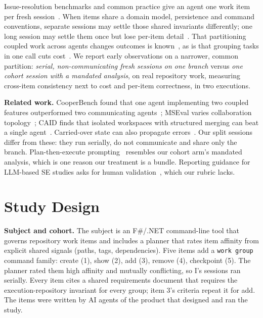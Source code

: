 \documentclass[10pt,conference]{IEEEtran}
\newcommand{\I}{I}
\begin{document}
Issue-resolution benchmarks and common practice give an agent one work item per fresh session~\cite{jimenez2024swebench}. When items share a domain model, persistence and command conventions, separate sessions may settle those shared invariants differently; one long session may settle them once but lose per-item detail~\cite{liu2024lost}. That partitioning coupled work across agents changes outcomes is known~\cite{khatua2026cooperbench,ren2026coordination}, as is that grouping tasks in one call cuts cost~\cite{cheng2023batch}. We report early observations on a narrower, common partition: \emph{serial, non-communicating fresh sessions on one branch} versus \emph{one cohort session with a mandated analysis}, on real repository work, measuring cross-item consistency next to cost and per-item correctness, in two executions.

\textbf{Related work.} CooperBench found that one agent implementing two coupled features outperformed two communicating agents~\cite{khatua2026cooperbench}; MSEval varies collaboration topology~\cite{ren2026coordination}; CAID finds that isolated workspaces with structured merging can beat a single agent~\cite{geng2026caid}. Carried-over state can also propagate errors~\cite{shen2026evocode}. Our split sessions differ from these: they run serially, do not communicate and share only the branch. Plan-then-execute prompting~\cite{wang2023plan} resembles our cohort arm's mandated analysis, which is one reason our treatment is a bundle. Reporting guidance for LLM-based SE studies asks for human validation~\cite{wagner2025towards}, which our rubric lacks.

\section{Study Design}

\textbf{Subject and cohort.} The subject is an F\#/.NET command-line tool that governs repository work items and includes a planner that rates item affinity from explicit shared signals (paths, tags, dependencies). Five items add a \texttt{work group} command family: create (1), show (2), add (3), remove (4), checkpoint (5). The planner rated them high affinity and mutually conflicting, so \I's sessions ran serially. %
Every item cites a shared requirements document that requires the execution-repository invariant for every group; item 3's criteria repeat it for add. %
The items were written by AI agents of the product that designed and ran the study. %
\end{document}
